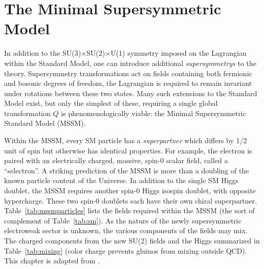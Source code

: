 \chapter{The Minimal Supersymmetric Model}
\label{chap:mssm}

In addition to the SU(3)$\times$SU(2)$\times$U(1) symmetry imposed on the Lagrangian within the Standard Model, one can introduce additional \textit{supersymmetrys} to the theory. Supersymmetry transformations act on fields containing both fermionic and bosonic degrees of freedom, the Lagrangian is required to remain invariant under rotations between these two states. Many such extensions to the Standard Model exist, but only the simplest of these, requiring a single global transformation $Q$ is phenomenologically viable: the Minimal Supersymmetric Standard Model (MSSM).

Within the MSSM, every SM particle has a \textit{superpartner} which differs by 1/2 unit of spin but otherwise has identical properties. For example, the electron is paired with an electrically charged, massive, spin-0 scalar field, called a ``selectron''.  A striking prediction of the MSSM is more than a doubling of the known particle content of the Universe. In addition to the single SM Higgs doublet, the MSSM requires another spin-0 Higgs isospin doublet, with opposite hypercharge. These two spin-0 doublets each have their own chiral superpartner. Table~\ref{tab:mssmparticles} lists the fields required within the MSSM (the sort of complement of Table~\ref{tab:sm}). As the nature of the newly supersymmetric electroweak sector is unknown, the various components of the fields may mix. The charged components from the new SU(2) fields and the Higgs summarized in Table~\ref{tab:mixing} (color charge prevents gluinos from mixing outside QCD). This chapter is adapted from \cite{susyprimer}.


